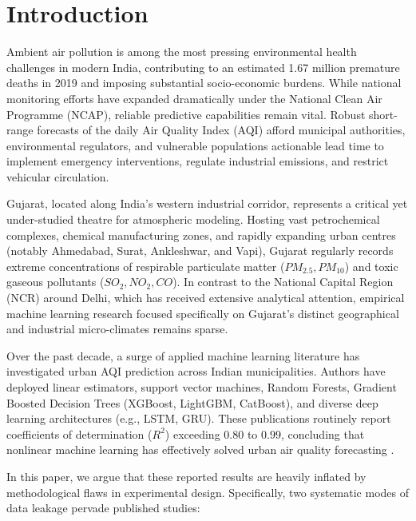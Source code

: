 \section{Introduction}
\label{sec:intro}

Ambient air pollution is among the most pressing environmental health challenges in modern India, contributing to an estimated 1.67 million premature deaths in 2019 \cite{pandey2021} and imposing substantial socio-economic burdens. While national monitoring efforts have expanded dramatically under the National Clean Air Programme (NCAP), reliable predictive capabilities remain vital. Robust short-range forecasts of the daily Air Quality Index (AQI) afford municipal authorities, environmental regulators, and vulnerable populations actionable lead time to implement emergency interventions, regulate industrial emissions, and restrict vehicular circulation.

Gujarat, located along India's western industrial corridor, represents a critical yet under-studied theatre for atmospheric modeling. Hosting vast petrochemical complexes, chemical manufacturing zones, and rapidly expanding urban centres (notably Ahmedabad, Surat, Ankleshwar, and Vapi), Gujarat regularly records extreme concentrations of respirable particulate matter ($PM_{2.5}, PM_{10}$) and toxic gaseous pollutants ($SO_2, NO_2, CO$). In contrast to the National Capital Region (NCR) around Delhi, which has received extensive analytical attention, empirical machine learning research focused specifically on Gujarat's distinct geographical and industrial micro-climates remains sparse.

Over the past decade, a surge of applied machine learning literature has investigated urban AQI prediction across Indian municipalities. Authors have deployed linear estimators, support vector machines, Random Forests, Gradient Boosted Decision Trees (XGBoost, LightGBM, CatBoost), and diverse deep learning architectures (e.g., LSTM, GRU). These publications routinely report coefficients of determination ($R^2$) exceeding $0.80$ to $0.99$, concluding that nonlinear machine learning has effectively solved urban air quality forecasting \cite{maltare2023}\cite{sidhu2024}\cite{mishra2025}\cite{jayapradha2025}\cite{chauhan2026}.

In this paper, we argue that these reported results are heavily inflated by methodological flaws in experimental design. Specifically, two systematic modes of data leakage pervade published studies:


